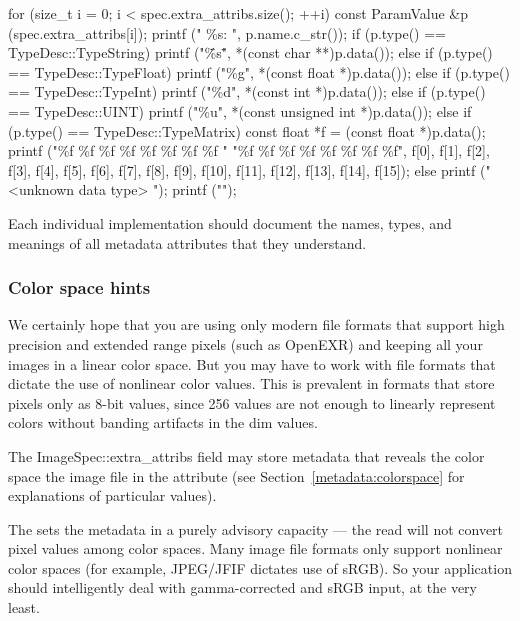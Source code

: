 \begin{code}
        for (size_t i = 0;  i < spec.extra_attribs.size();  ++i) {
            const ParamValue &p (spec.extra_attribs[i]);
            printf ("    \%s: ", p.name.c_str());
            if (p.type() == TypeDesc::TypeString)
                printf ("\"\%s\"", *(const char **)p.data());
            else if (p.type() == TypeDesc::TypeFloat)
                printf ("\%g", *(const float *)p.data());
            else if (p.type() == TypeDesc::TypeInt)
                printf ("\%d", *(const int *)p.data());
            else if (p.type() == TypeDesc::UINT)
                printf ("\%u", *(const unsigned int *)p.data());
            else if (p.type() == TypeDesc::TypeMatrix) {
                const float *f = (const float *)p.data();
                printf ("\%f \%f \%f \%f \%f \%f \%f \%f "
                        "\%f \%f \%f \%f \%f \%f \%f \%f",
                        f[0], f[1], f[2], f[3], f[4], f[5], f[6], f[7],
                        f[8], f[9], f[10], f[11], f[12], f[13], f[14], f[15]);
            }
            else
                printf (" <unknown data type> ");
            printf ("\n");
        }
\end{code}

Each individual \ImageInput implementation should document the names,
types, and meanings of all metadata attributes that they understand.

\subsubsection{Color space hints}

We certainly hope that you are using only modern file formats that
support high precision and extended range pixels (such as OpenEXR) and
keeping all your images in a linear color space.  But you may have to
work with file formats that dictate the use of nonlinear color values.
This is prevalent in formats that store pixels only as 8-bit values,
since 256 values are not enough to linearly represent colors without
banding artifacts in the dim values.

The {\cf ImageSpec::extra_attribs} field may store metadata that reveals
the color space the image file in the 
attribute (see Section~\ref{metadata:colorspace} for explanations of
particular values).

The \ImageInput sets the  metadata in a
purely advisory capacity --- the {\cf read} will not convert pixel
values among color spaces.  Many image file formats only support
nonlinear color spaces (for example, JPEG/JFIF dictates use of sRGB).
So your application should intelligently deal with gamma-corrected and
sRGB input, at the very least.

